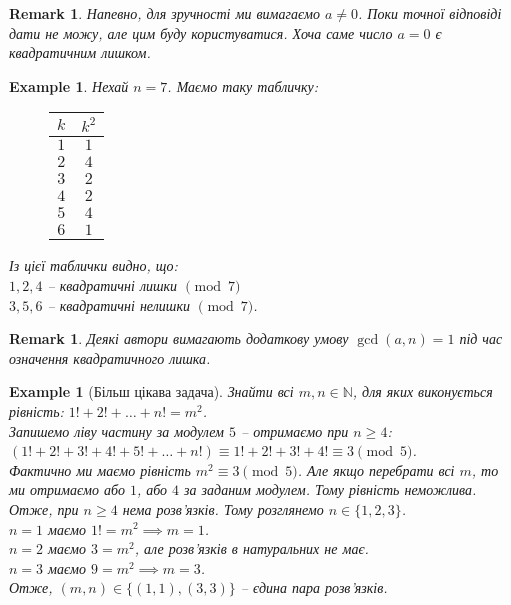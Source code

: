\documentclass[a4paper, 14pt]{extarticle}
\theoremstyle{theoremdd}
\theoremstyle{theoremdd}
\theoremstyle{theoremdd}
\theoremstyle{theoremdd}
\newtheorem{example}[theorem]{Example}
\theoremstyle{theoremdd}
\theoremstyle{theoremdd}
\newtheorem{remark}[theorem]{Remark}
\theoremstyle{theoremdd}
\theoremstyle{theoremdd}
\begin{document}
\begin{remark}
Напевно, для зручності ми вимагаємо $a \neq 0$. Поки точної відповіді дати не можу, але цим буду користуватися. Хоча саме число $a = 0$ є квадратичним лишком.
\end{remark}

\begin{example}
Нехай $n = 7$. Маємо таку табличку:
\begin{figure}[H]
\centering
\begin{tabular}{c|c}
$k$ & $k^2$ \\
\hline
$1$ & $1$ \\
\hline
$2$ & $4$ \\
\hline
$3$ & $2$ \\
\hline
$4$ & $2$ \\
\hline
$5$ & $4$ \\
\hline
$6$ & $1$
\end{tabular}
\end{figure}
Із цієї таблички видно, що:\\
$1,2,4$ -- квадратичні лишки $\pmod 7$\\
$3,5,6$ -- квадратичні нелишки $\pmod 7$.
\end{example}

\iffalse
\begin{remark}
Michael Penn допустився помилки під час визначення квадратичного лишка. У нього була умова $\gcd(a,n) = 1$, що не обов'язкова. Хоча на майбутнє це буде потрібно.\\
Зокрема $4$ - квадратичний лишок $\pmod 6$, тому що $4 \equiv 2^2 \pmod 6$, хоча тут $\gcd(4,6) \neq 2$.
\end{remark}
\fi

\begin{remark}
Деякі автори вимагають додаткову умову $\gcd(a,n) = 1$ під час означення квадратичного лишка.
\end{remark}

\begin{example}[Більш цікава задача]
Знайти всі $m,n \in \mathbb{N}$, для яких виконується рівність: $1! + 2! + \dots + n! = m^2$.\\
Запишемо ліву частину за модулем $5$ -- отримаємо при $n \geq 4$:\\
$(1! + 2! + 3! + 4! + 5! + \dots + n!) \equiv 1! + 2! + 3! + 4! \equiv 3 \pmod 5$.\\
Фактично ми маємо рівність $m^2 \equiv 3 \pmod 5$. Але якщо перебрати всі $m$, то ми отримаємо або $1$, або $4$ за заданим модулем. Тому рівність неможлива.\\
Отже, при $n \geq 4$ нема розв'язків. Тому розглянемо $n \in \{1,2,3\}$.\\
$n = 1$ маємо $1! = m^2 \implies m = 1$.\\
$n = 2$ маємо $3 = m^2$, але розв'язків в натуральних не має.\\
$n = 3$ маємо $9 = m^2 \implies m = 3$.\\
Отже, $(m,n) \in \{(1,1),(3,3)\}$ -- єдина пара розв'язків.
\end{example}
\end{document}
